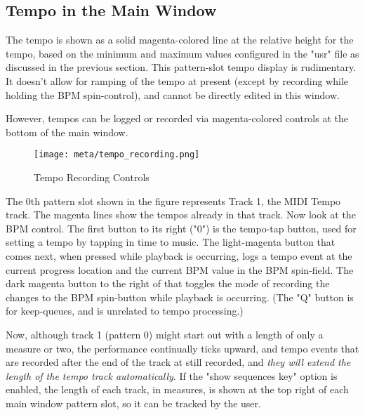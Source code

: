 \subsection{Tempo in the Main Window}
\label{subsec:meta_events_mainwid}

%
%

The tempo is shown as a solid magenta-colored line at the relative height
for the tempo,
based on the minimum and maximum values configured in the "usr" file as
discussed in the previous section.
This pattern-slot tempo display is rudimentary.  It doesn't allow for ramping
of the tempo at present (except by recording while holding the BPM
spin-control), and cannot be directly edited in this window.

However, tempos can be logged or recorded via magenta-colored controls at the
bottom of the main window.

\begin{figure}[H]
   \centering 
   \texttt{[image: meta/tempo\_recording.png]}
   \caption{Tempo Recording Controls}
   \label{fig:meta_events_mainwid_tempo_recording}
\end{figure}

The 0th pattern slot shown in the figure represents Track 1, the
MIDI Tempo track.  The magenta lines show the tempos already in that track.
Now look at the BPM control.  The first button to its right ("0") is the
tempo-tap button, used for setting a tempo by tapping in time to music.
The light-magenta button that comes next, when pressed while playback is
occurring, logs a tempo event at the current progress location and the
current BPM value in the BPM spin-field.  The dark magenta button to the right
of that toggles the mode of recording the changes to the BPM spin-button while
playback is occurring.  (The "Q" button is for keep-queues, and is unrelated to
tempo processing.)

Now, although track 1 (pattern 0) might start out with a length of only a
measure or two, the performance continually ticks upward, and tempo events that
are recorded after the end of the track at still recorded, and
\textsl{they will extend the length of the tempo track automatically}.
If the "show sequences key" option is enabled, the length of each track, in
measures, is shown at the top right of each main window pattern slot, so it can
be tracked by the user.

